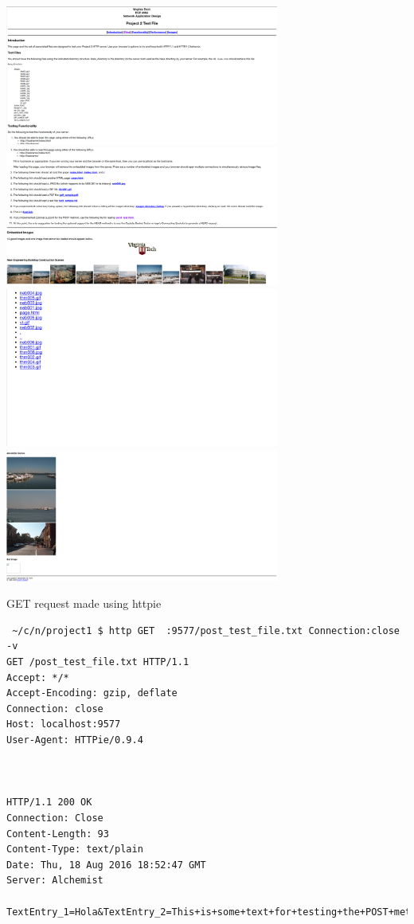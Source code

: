 \documentclass[11pt]{article}
\begin{document}
\includegraphics[width=9cm]{./index1.png}
\includegraphics[width=9cm]{./index2.png} \\
\includegraphics[width=9cm]{./directorylist.png}
\includegraphics[width=9cm]{./index3.png}

\noindent GET request made using httpie
\begin{verbatim}
 ~/c/n/project1 $ http GET  :9577/post_test_file.txt Connection:close -v
GET /post_test_file.txt HTTP/1.1
Accept: */*
Accept-Encoding: gzip, deflate
Connection: close
Host: localhost:9577
User-Agent: HTTPie/0.9.4



HTTP/1.1 200 OK
Connection: Close
Content-Length: 93
Content-Type: text/plain
Date: Thu, 18 Aug 2016 18:52:47 GMT
Server: Alchemist

TextEntry_1=Hola&TextEntry_2=This+is+some+text+for+testing+the+POST+method.%0D%0A&Item=Item_1
\end{verbatim}
\end{document}
